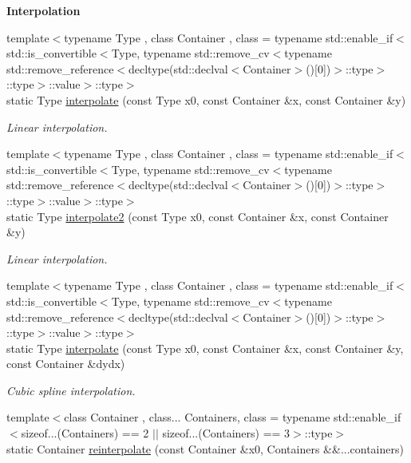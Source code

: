 \begin{Indent}{\bf Interpolation}\par
\begin{DoxyCompactItemize}
\item 
{\footnotesize template$<$typename Type , class Container , class  = typename std\-::enable\-\_\-if$<$std\-::is\-\_\-convertible$<$\-Type, typename std\-::remove\-\_\-cv$<$typename std\-::remove\-\_\-reference$<$decltype(std\-::declval$<$\-Container$>$()\mbox{[}0\mbox{]})$>$\-::type$>$\-::type$>$\-::value$>$\-::type$>$ }\\static Type \hyperlink{exceptionUtility_a09c000a5e0430e44b33f237c33729b3f}{interpolate} (const Type x0, const Container \&x, const Container \&y)
\begin{DoxyCompactList}\small\item\em Linear interpolation. \end{DoxyCompactList}\item 
{\footnotesize template$<$typename Type , class Container , class  = typename std\-::enable\-\_\-if$<$std\-::is\-\_\-convertible$<$\-Type, typename std\-::remove\-\_\-cv$<$typename std\-::remove\-\_\-reference$<$decltype(std\-::declval$<$\-Container$>$()\mbox{[}0\mbox{]})$>$\-::type$>$\-::type$>$\-::value$>$\-::type$>$ }\\static Type \hyperlink{exceptionUtility_aff6032e23a99ce0d9c340540eec60fb1}{interpolate2} (const Type x0, const Container \&x, const Container \&y)
\begin{DoxyCompactList}\small\item\em Linear interpolation. \end{DoxyCompactList}\item 
{\footnotesize template$<$typename Type , class Container , class  = typename std\-::enable\-\_\-if$<$std\-::is\-\_\-convertible$<$\-Type, typename std\-::remove\-\_\-cv$<$typename std\-::remove\-\_\-reference$<$decltype(std\-::declval$<$\-Container$>$()\mbox{[}0\mbox{]})$>$\-::type$>$\-::type$>$\-::value$>$\-::type$>$ }\\static Type \hyperlink{exceptionUtility_ade50afc38a5d7233c38f909edd579302}{interpolate} (const Type x0, const Container \&x, const Container \&y, const Container \&dydx)
\begin{DoxyCompactList}\small\item\em Cubic spline interpolation. \end{DoxyCompactList}\item 
{\footnotesize template$<$class Container , class... Containers, class  = typename std\-::enable\-\_\-if$<$sizeof...(\-Containers) == 2 $|$$|$ sizeof...(\-Containers) == 3$>$\-::type$>$ }\\static Container \hyperlink{exceptionUtility_a449edb7f02ef05f0c1fe2e219b8929b6}{reinterpolate} (const Container \&x0, Containers \&\&...containers)

\end{DoxyCompactItemize}
\end{Indent}
